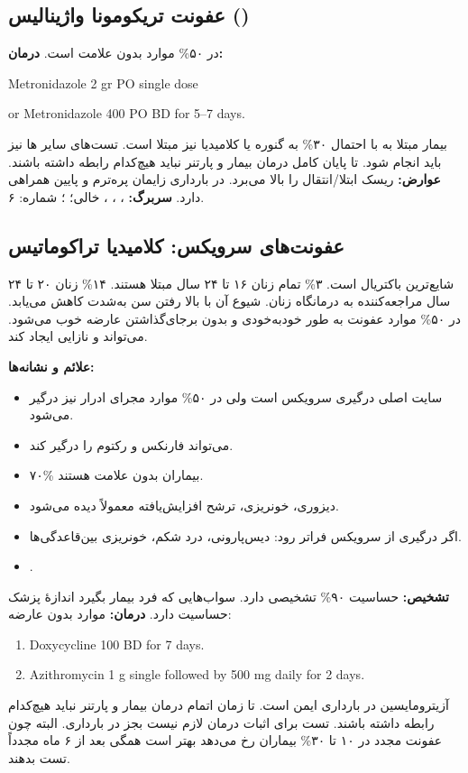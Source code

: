 \documentclass[12pt,a4paper]{article}
\begin{document}
\subsection*{عفونت تریکومونا واژینالیس ()}
در ۵۰\% موارد بدون علامت است.
\textbf{درمان:}
\begin{latin}
Metronidazole 2 gr PO single dose\par
or Metronidazole 400 PO BD for 5--7 days.
\end{latin}
بیمار مبتلا به  با احتمال ۳۰\% به گنوره یا کلامیدیا نیز مبتلا است.
تست‌های سایر ها نیز باید انجام شود.
تا پایان کامل درمان بیمار و پارتنر نباید هیچ‌کدام رابطه داشته باشند.
\textbf{عوارض:} ریسک ابتلا/انتقال  را بالا می‌برد.
در بارداری زایمان پره‌ترم و  پایین همراهی دارد.
\textbf{سربرگ:} ، ، ،  خالی؛ ؛ شماره: ۶.
\subsection*{عفونت‌های سرویکس: کلامیدیا تراکوماتیس}
شایع‌ترین  باکتریال است.
۳\% تمام زنان ۱۶ تا ۲۴ سال مبتلا هستند. ۱۴\% زنان ۲۰ تا ۲۴ سال مراجعه‌کننده به درمانگاه زنان.
شیوع آن با بالا رفتن سن به‌شدت کاهش می‌یابد.
در ۵۰\% موارد عفونت به طور خودبه‌خودی و بدون برجای‌گذاشتن عارضه خوب می‌شود.
می‌تواند  و نازایی  ایجاد کند.

\textbf{علائم و نشانه‌ها:}
\begin{itemize}
\item سایت اصلی درگیری سرویکس است ولی در ۵۰\% موارد مجرای ادرار نیز درگیر می‌شود.
\item می‌تواند فارنکس و رکتوم را درگیر کند.
\item ۷۰\% بیماران بدون علامت هستند.
\item دیزوری، خونریزی، ترشح افزایش‌یافته معمولاً دیده می‌شود.
\item اگر درگیری از سرویکس فراتر رود: دیس‌پارونی، درد شکم، خونریزی بین‌قاعدگی‌ها.
\item {}.
\end{itemize}
\textbf{تشخیص:}  حساسیت ۹۰\% تشخیصی دارد.
سواب‌هایی که فرد بیمار بگیرد اندازهٔ پزشک حساسیت دارد.
\textbf{درمان:} موارد بدون عارضه:
\begin{latin}\begin{enumerate}
\item Doxycycline 100 BD for 7 days.
\item Azithromycin 1 g single followed by 500 mg daily for 2 days.
\end{enumerate}\end{latin}
آزیترومایسین در بارداری ایمن است.
تا زمان اتمام درمان بیمار و پارتنر نباید هیچ‌کدام رابطه داشته باشند.
تست برای اثبات درمان لازم نیست بجز در بارداری.
البته چون عفونت مجدد در ۱۰ تا ۳۰\% بیماران رخ می‌دهد بهتر است همگی بعد از ۶ ماه مجدداً تست بدهند.
\end{document}

